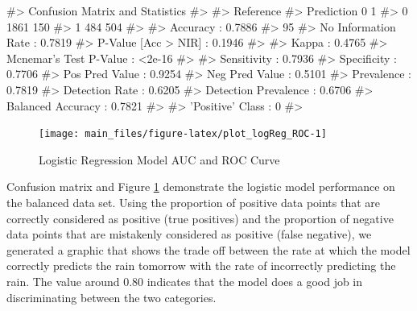 \begin{Schunk}
\begin{Soutput}
#> Confusion Matrix and Statistics
#> 
#>           Reference
#> Prediction    0    1
#>          0 1861  150
#>          1  484  504
#>                                           
#>                Accuracy : 0.7886          
#>                  95%
#>     No Information Rate : 0.7819          
#>     P-Value [Acc > NIR] : 0.1946          
#>                                           
#>                   Kappa : 0.4765          
#>  Mcnemar's Test P-Value : <2e-16          
#>                                           
#>             Sensitivity : 0.7936          
#>             Specificity : 0.7706          
#>          Pos Pred Value : 0.9254          
#>          Neg Pred Value : 0.5101          
#>              Prevalence : 0.7819          
#>          Detection Rate : 0.6205          
#>    Detection Prevalence : 0.6706          
#>       Balanced Accuracy : 0.7821          
#>                                           
#>        'Positive' Class : 0               
#> 
\end{Soutput}
\end{Schunk}

\begin{Schunk}
\begin{figure}[H]

{\centering \texttt{[image: main\_files/figure-latex/plot\_logReg\_ROC-1]} 

}

\caption[Logistic Regression Model AUC and ROC Curve]{Logistic Regression Model AUC and ROC Curve}\label{fig:plot_logReg_ROC}
\end{figure}
\end{Schunk}

Confusion matrix and Figure \ref{fig:plot_logReg_ROC} demonstrate the
logistic model performance on the balanced data set. Using the
proportion of positive data points that are correctly considered as
positive (true positives) and the proportion of negative data points
that are mistakenly considered as positive (false negative), we
generated a graphic that shows the trade off between the rate at which
the model correctly predicts the rain tomorrow with the rate of
incorrectly predicting the rain. The value around 0.80 indicates that
the model does a good job in discriminating between the two categories.

